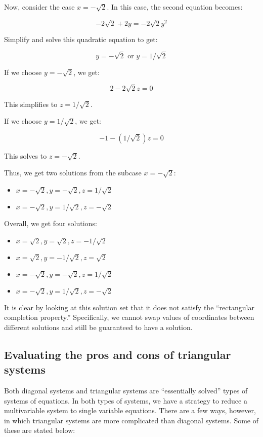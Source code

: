 \documentclass[10pt]{amsart}
\begin{document}
Now, consider the case $x = -\sqrt{2}$. In this case, the second equation becomes:

$$-2\sqrt{2} + 2y = -2\sqrt{2}y^2$$

Simplify and solve this quadratic equation to get:

$$y = -\sqrt{2} \text{ or } y = 1/\sqrt{2}$$

If we choose $y = -\sqrt{2}$, we get:

$$2 - 2\sqrt{2}z = 0$$

This simplifies to $z = 1/\sqrt{2}$.

If we choose $y = 1/\sqrt{2}$, we get:

$$-1 -(1/\sqrt{2})z = 0$$

This solves to $z = -\sqrt{2}$.

Thus, we get two solutions from the subcase $x = -\sqrt{2}$:

\begin{itemize}
\item $x = -\sqrt{2},y = -\sqrt{2},z = 1/\sqrt{2}$
\item $x = -\sqrt{2},y = 1/\sqrt{2}, z = -\sqrt{2}$
\end{itemize}

Overall, we get four solutions:

\begin{itemize}
\item $x = \sqrt{2}, y = \sqrt{2}, z = -1/\sqrt{2}$
\item $x = \sqrt{2}, y = -1/\sqrt{2}, z = \sqrt{2}$
\item $x = -\sqrt{2},y = -\sqrt{2},z = 1/\sqrt{2}$
\item $x = -\sqrt{2},y = 1/\sqrt{2}, z = -\sqrt{2}$
\end{itemize}

It is clear by looking at this solution set that it does not satisfy
the ``rectangular completion property.'' Specifically, we cannot swap
values of coordinates between different solutions and still be
guaranteed to have a solution.

\subsection{Evaluating the pros and cons of triangular systems}

Both diagonal systems and triangular systems are ``essentially
solved'' types of systems of equations. In both types of systems, we
have a strategy to reduce a multivariable system to single variable
equations. There are a few ways, however, in which triangular systems
are more complicated than diagonal systems. Some of these are stated below:
\end{document}
